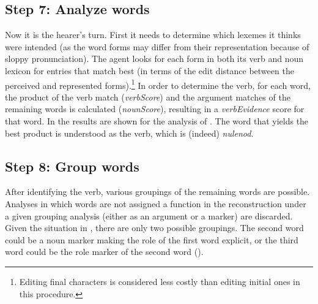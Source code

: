 \documentclass[output=paper]{LSP/langsci}
\begin{document}
	
\subsection{Step 7: Analyze words}\label{17-le-sec:Analyze}
Now it is the hearer's turn. First it needs to determine which lexemes it thinks were intended (as the word forms may differ from their representation because of sloppy pronunciation). The agent looks for each form in both its verb and noun lexicon for entries that match best (in terms of the edit distance between the perceived and represented forms).\footnote{Editing final characters is considered less costly than editing initial ones in this procedure.} In order to determine the verb, for each word, the product of the verb match (\textit{verbScore}) and the argument matches of the remaining words is calculated (\textit{nounScore}), resulting in a \textit{verbEvidence} score for that word. In  the results are shown for the analysis of . The word that yields the best product is understood as the verb, which is (indeed) \textit{nulenod}. 

\begin{table}
\caption{Identifying the verb in the AFTF utterance. \label{verbid}}
\end{table}

\subsection{Step 8: Group words}\label{17-le-sec:Group-Words}
After identifying the verb, various groupings of the remaining words are possible. Analyses in which words are not assigned a function in the reconstruction under a given grouping analysis (either as an argument or a marker) are discarded. Given the situation in , there are only two possible groupings. The second word could be a noun marker making the role of the first word explicit, or the third word could be the role marker of the second word (\cf {}). 
\end{document}
